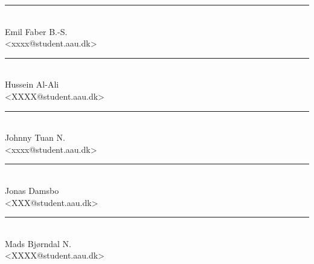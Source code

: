 \noindent
\begin{minipage}[b]{0.45\textwidth}
	\centering
	\rule{\textwidth}{0.5pt}\\
	Emil Faber B.-S.\\
	{\footnotesize <xxxx@student.aau.dk>}
\end{minipage}
%
\hfill
%
\begin{minipage}[b]{0.45\textwidth}
	\centering
	\rule{\textwidth}{0.5pt}\\
	Hussein Al-Ali\\
	{\footnotesize <XXXX@student.aau.dk>}
\end{minipage}
\vspace{3\baselineskip}

\noindent
\begin{minipage}[b]{0.45\textwidth}
	\centering
	\rule{\textwidth}{0.5pt}\\
	Johnny Tuan N.\\
	{\footnotesize <xxxx@student.aau.dk>}
\end{minipage}
%
\hfill
%
\begin{minipage}[b]{0.45\textwidth}
	\centering
	\rule{\textwidth}{0.5pt}\\
	Jonas Damsbo\\
	{\footnotesize <XXX@student.aau.dk>}
\end{minipage}

\hfill
%
\begin{minipage}[b]{0.45\textwidth}
	\centering
	\rule{\textwidth}{0.5pt}\\
	Mads Bjørndal N.\\
	{\footnotesize <XXXX@student.aau.dk>}
\end{minipage}
\vspace{3\baselineskip}


\vspace{3\baselineskip}

